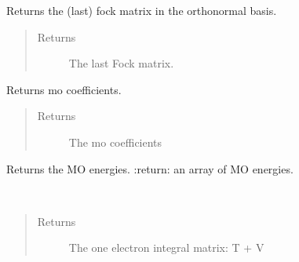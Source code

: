 \documentclass[letterpaper,10pt,english]{sphinxmanual}
\begin{document}
\begin{fulllineitems}
\begin{fulllineitems}
\label{\detokenize{RHF:hf.HartreeFock.RHF.MF.get_fock_orth}}
Returns the (last) fock matrix in the orthonormal basis.
\begin{quote}\begin{description}
\item[{Returns}] \leavevmode
The last Fock matrix.

\end{description}\end{quote}

\end{fulllineitems}


\begin{fulllineitems}
\label{\detokenize{RHF:hf.HartreeFock.RHF.MF.get_mo_coeff}}
Returns mo coefficients.
\begin{quote}\begin{description}
\item[{Returns}] \leavevmode
The mo coefficients

\end{description}\end{quote}

\end{fulllineitems}


\begin{fulllineitems}
\label{\detokenize{RHF:hf.HartreeFock.RHF.MF.get_mo_energy}}
Returns the MO energies.
:return: an array of MO energies.

\end{fulllineitems}


\begin{fulllineitems}
\label{\detokenize{RHF:hf.HartreeFock.RHF.MF.get_one_e}}~\begin{quote}\begin{description}
\item[{Returns}] \leavevmode
The one electron integral matrix: T + V


\end{description}
\end{quote}
\end{fulllineitems}
\end{fulllineitems}
\end{document}
